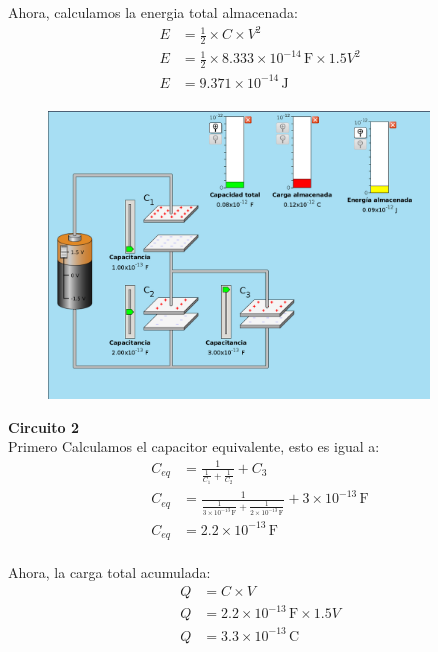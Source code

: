 \documentclass[12pt]{report}
\begin{document}
\begin{enumerate}
Ahora, calculamos la energia total almacenada:\\
\begin{align*}
    E&=\frac{1}{2}\times C\times V^2\\[6pt]
    E&=\frac{1}{2}\times 8.333 \times 10^{-14} \, \text{F} \times 1.5V^2\\[6pt]
    E&= 9.371 \times 10^{-14} \, \text{J}\\[20pt]
\end{align*}

\begin{figure}[h]
    \centering
    \includegraphics[width=0.9\textwidth]{./images/foto1ejercicio3Conexiondecapacitores.png}
\end{figure}

\vspace{5cm}

    \textbf{Circuito 2}\\
    Primero Calculamos el capacitor equivalente, esto es igual a:\\
\begin{align*}
    C_{eq}&=\frac{1}{\frac{1}{C_1}+\frac{1}{C_2}}+C_3\\[6pt]
    C_{eq}&=\frac{1}{\frac{1}{3 \times 10^{-13} \, \text{F} }+\frac{1}{2 \times 10^{-13} \, \text{F}}}+ 3 \times 10^{-13} \, \text{F}\\[6pt]
    C_{eq}&=2.2 \times 10^{-13} \, \text{F}\\[6pt]
\end{align*}

Ahora, la carga total acumulada:\\
\begin{align*}
    Q&=C \times V\\[6pt]
    Q&=2.2 \times 10^{-13} \, \text{F} \times 1.5V \\[6pt]
    Q&=3.3 \times 10^{-13} \, \text{C}\\[6pt]
\end{align*}


\end{enumerate}
\end{document}
